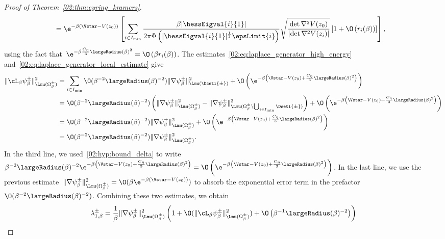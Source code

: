 \begin{proof}[Proof of Theorem~\ref{02:thm:eyring_kramers}]
\[\begin{aligned}
            &=\e^{-\beta(\Vstar-V(z_0))} \left[\sum_{i\in I_{\min}} \frac{\beta|\hessEigval{i}{1}|}{2\pi\Phi\left(|\hessEigval{i}{1}|^{\frac12}\epsLimit{i}\right)}\sqrt{\frac{\det \nabla^2 V(z_0)}{\left|\det \nabla ^2 V(z_i)\right|}} \left[1 +\O\left(r_i(\beta)\right)\right]\right],\end{aligned}\]
            using the fact that~$\e^{-\beta\frac{C_\eta}3 \largeRadius(\beta)^2}=\O\left(\beta r_i(\beta)\right)$. The estimates~\eqref{02:eq:laplace_generator_high_energy} and~\eqref{02:eq:laplace_generator_local_estimate} give
            \[\begin{aligned}
                \|\cL_\beta \psi_\beta^\pm\|^2_{\Lmu(\Omega_\beta^\pm)} &= \sum_{i\in I_{\min}} \O(\beta^{-2}\largeRadius(\beta)^{-2})\|\nabla \psi_\beta^\pm\|^2_{\Lmu(\Dseti{\pm})} + \O\left(\e^{-\beta\left(\Vstar - V(z_0) +\frac{C_\eta}3 \largeRadius(\beta)^2\right)}\right)\\
                &= \O(\beta^{-2}\largeRadius(\beta)^{-2})\left(\|\nabla \psi_\beta^\pm\|^2_{\Lmu(\Omega_\beta^\pm)} - \|\nabla \psi_\beta^\pm\|^2_{\Lmu(\Omega_\beta^\pm\setminus \bigcup_{i\in I_{\min}}\Dseti{\pm})}\right) + \O\left(\e^{-\beta\left(\Vstar - V(z_0) +\frac{C_\eta}3 \largeRadius(\beta)^2\right)}\right)\\
                &= \O(\beta^{-2}\largeRadius(\beta)^{-2})\|\nabla \psi_\beta^\pm\|^2_{\Lmu(\Omega_\beta^\pm)} + \O\left(\e^{-\beta\left(\Vstar - V(z_0) +\frac{C_\eta}3 \largeRadius(\beta)^2\right)}\right)\\
                &= \O(\beta^{-2}\largeRadius(\beta)^{-2})\|\nabla \psi_\beta^\pm\|^2_{\Lmu(\Omega_\beta^\pm)}.
            \end{aligned}\]
            In the third line, we used~\eqref{02:hyp:bound_delta} to write~$\beta^{-2}\largeRadius(\beta)^{-2}\e^{-\beta\left(\Vstar - V(z_0) +\frac{C_\eta}3 \largeRadius(\beta)^2\right)} = \O\left(\e^{-\beta\left(\Vstar - V(z_0) +\frac{C_\eta}3 \largeRadius(\beta)^2\right)}\right)$.
            In the last line, we use the previous estimate~$\|\nabla \psi_\beta^\pm\|^2_{\Lmu(\Omega_\beta^\pm)} = \O(\beta\e^{-\beta(\Vstar-V(z_0))})$ to absorb the exponential error term in the prefactor~$\O(\beta^{-2}\largeRadius(\beta)^{-2})$. Combining these two estimates, we obtain
            \[\begin{aligned}\lambda^\pm_{1,\beta} &= \frac1\beta\|\nabla \psi_\beta^\pm\|^2_{\Lmu(\Omega_\beta^\pm)}\left(1+\O(\|\cL_\beta \psi_\beta^\pm\|^2_{\Lmu(\Omega_\beta^\pm)})+\O\left(\beta^{-1}\largeRadius(\beta)^{-2}\right)\right)\\

\end{aligned}\]
\end{proof}
